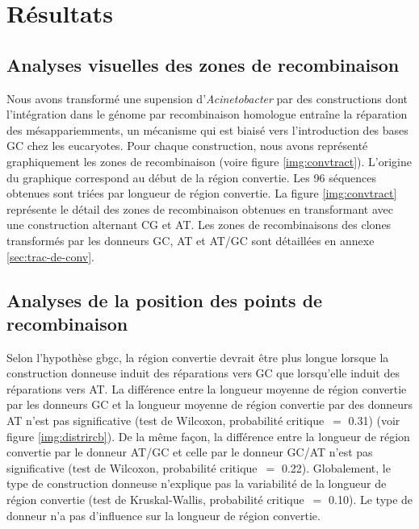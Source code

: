 \section{Résultats}
\label{sec:resultats}


\subsection{Analyses visuelles des zones de recombinaison}
\label{subsec:visu}

Nous avons transformé une supension d'\emph{Acinetobacter} par des constructions
dont l'intégration dans le génome par recombinaison homologue entraîne la
réparation des mésappariemments, un mécanisme qui est biaisé vers l'introduction
des bases GC chez les eucaryotes. Pour chaque construction, nous avons
représenté graphiquement les zones de recombinaison (voire figure
\ref{img:convtract}). L'origine du graphique correspond au début de la région
convertie. Les 96 séquences obtenues sont triées par longueur de région
convertie. La figure \ref{img:convtract} représente le détail des zones de
recombinaison obtenues en transformant avec une construction alternant CG et AT.
Les zones de recombinaisons des clones transformés par les donneurs GC, AT et
AT/GC sont détaillées en annexe \ref{sec:trac-de-conv}.

\subsection{Analyses de la position des points de recombinaison}
\label{subsec:distribution-points}

Selon l'hypothèse \ac{gbgc}, la région convertie devrait être plus longue
lorsque la construction donneuse induit des réparations vers GC que lorsqu'elle
induit des réparations vers AT. La différence entre la longueur moyenne de
région convertie par les donneurs GC et la longueur moyenne de région convertie
par des donneurs AT n'est pas significative (test de Wilcoxon, probabilité
critique~\(=\) \num{0.31}) (voir figure \ref{img:distrircb}). De la même façon, la
différence entre la longueur de région convertie par le donneur AT/GC et celle
par le donneur GC/AT n'est pas significative (test de Wilcoxon, probabilité
critique~\(=\) \num{0.22}). Globalement, le type de construction donneuse n'explique
pas la variabilité de la longueur de région convertie (test de Kruskal-Wallis,
probabilité critique~\(=\) \num{0.10}). Le type de donneur n'a pas d'influence sur la
longueur de région convertie.

